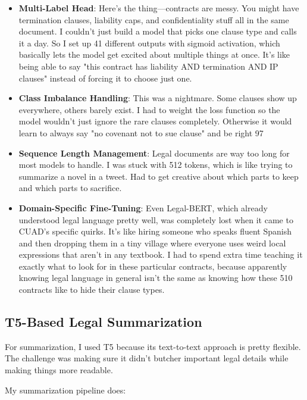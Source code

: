 \begin{itemize}
    \item \textbf{Multi-Label Head}: Here's the thing—contracts are messy. You might have termination clauses, liability caps, and confidentiality stuff all in the same document. I couldn't just build a model that picks one clause type and calls it a day. So I set up 41 different outputs with sigmoid activation, which basically lets the model get excited about multiple things at once. It's like being able to say "this contract has liability AND termination AND IP clauses" instead of forcing it to choose just one.
    \item \textbf{Class Imbalance Handling}: This was a nightmare. Some clauses show up everywhere, others barely exist. I had to weight the loss function so the model wouldn't just ignore the rare clauses completely. Otherwise it would learn to always say "no covenant not to sue clause" and be right 97%
    \item \textbf{Sequence Length Management}: Legal documents are way too long for most models to handle. I was stuck with 512 tokens, which is like trying to summarize a novel in a tweet. Had to get creative about which parts to keep and which parts to sacrifice.
    \item \textbf{Domain-Specific Fine-Tuning}: Even Legal-BERT, which already understood legal language pretty well, was completely lost when it came to CUAD's specific quirks. It's like hiring someone who speaks fluent Spanish and then dropping them in a tiny village where everyone uses weird local expressions that aren't in any textbook. I had to spend extra time teaching it exactly what to look for in these particular contracts, because apparently knowing legal language in general isn't the same as knowing how these 510 contracts like to hide their clause types.
\end{itemize}

\subsection{T5-Based Legal Summarization}

For summarization, I used T5 \cite{raffel2020t5} because its text-to-text approach is pretty flexible. The challenge was making sure it didn't butcher important legal details while making things more readable.

My summarization pipeline does:

